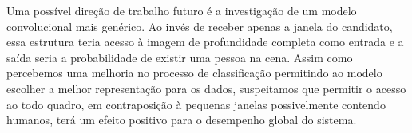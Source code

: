     Uma possível direção de trabalho futuro é a investigação de um modelo convolucional mais genérico. Ao invés de receber apenas a janela do candidato, essa estrutura teria acesso à imagem de profundidade completa como entrada e a saída seria a probabilidade de existir uma pessoa na cena. Assim como percebemos uma melhoria no processo de classificação permitindo ao modelo escolher a melhor representação para os dados, suspeitamos que permitir o acesso ao todo quadro, em contraposição à pequenas janelas possivelmente contendo humanos, terá um efeito positivo para o desempenho global do sistema.

